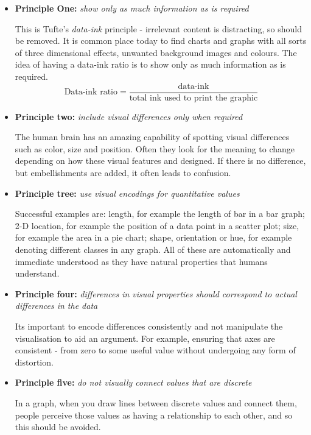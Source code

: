 \documentclass[a4paper,11pt,titlepage]{article}
\begin{document}
		\par
	\begin{itemize}
		\item \textbf{Principle One:}
		\textit{show only as much information as is required}
		\par 
		This is Tufte's \textit{data-ink} principle - irrelevant content is distracting, so should be removed. It is common place today to find charts and graphs with all sorts of three dimensional effects, unwanted background images and colours. The idea of having a data-ink ratio is to show only as much information as is required.
		$$
		\text{Data-ink ratio} = 
		\frac{\text{data-ink}}{\text{total ink used to print the graphic}}
		$$

		\item \textbf{Principle two:}
		\textit{include visual differences only when required} 
		\par
		The human brain has an amazing capability of spotting visual differences such as color, size and position. Often they look for the meaning to change depending on how these visual features and designed. If there is no difference, but embellishments are added, it often leads to confusion.

		\item \textbf{Principle tree:}
		\textit{use visual encodings for quantitative values}
		\par 
		Successful examples are: length, for example the length of bar in a bar graph; 2-D location, for example the position of a data point in a scatter plot; size, for example the area in a pie chart; shape, orientation or hue, for example denoting different classes in any graph. All of these are automatically and immediate understood as they have natural properties that humans understand. 

		\item \textbf{Principle four:}
		\textit{differences in visual properties should correspond to actual differences in the data}
		\par 
		Its important to encode differences consistently and not manipulate the visualisation to aid an argument. For example, ensuring that axes are consistent - from zero to some useful value without undergoing any form of distortion.

		\item \textbf{Principle five:}
		\textit{do not visually connect values that are discrete}
		\par 
		In a graph, when you draw lines between discrete values and connect them, people perceive those values as having a relationship to each other, and so this should be avoided.


\end{itemize}
\end{document}
